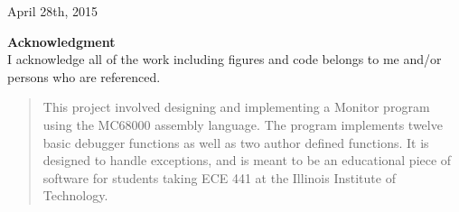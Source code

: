 \documentclass[12pt]{article}
\begin{document}
\begin{titlepage}
		
		
		{\large April 28th, 2015}\\[3cm] %
		
		
		
		
		\vfill %
		
		\textbf{Acknowledgment} \\ \flushleft I acknowledge all of the work including figures and code belongs to me and/or persons who are referenced.
	\end{titlepage}
	
	\tableofcontents
	\newpage
	\listoffigures
	\newpage
	\begin{abstract}
		This project involved designing and implementing a Monitor program using the MC68000 assembly language. The program implements twelve basic debugger functions as well as two author defined functions. It is designed to handle exceptions, and is meant to be an educational piece of software for students taking ECE 441 at the Illinois Institute of Technology.
	\end{abstract}
	
\end{document}
